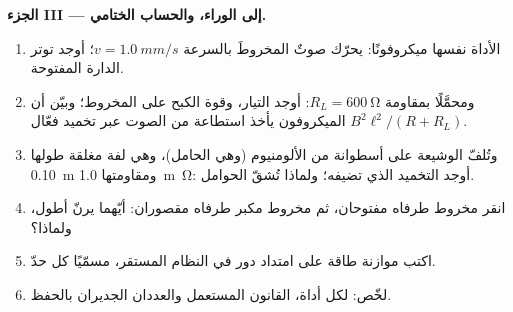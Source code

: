 \begin{problem}
\medskip
\noindent\textbf{الجزء III --- إلى الوراء، والحساب الختامي.}
\begin{enumerate}[resume]
  \item الأداة نفسها ميكروفونًا: يحرّك صوتٌ المخروطَ بالسرعة
        $v = \qty{1.0}{mm/s}$؛ أوجد توتر الدارة المفتوحة.
  \item ومحمَّلًا بمقاومة $R_L = \qty{600}{\ohm}$: أوجد التيار، وقوة الكبح
        على المخروط؛ وبيّن أن الميكروفون يأخذ استطاعة من الصوت
        عبر تخميد فعّال $B^2\ell^2/(R + R_L)$.
  \item وتُلفّ الوشيعة على أسطوانة من الألومنيوم (وهي الحامل)، وهي
        لفة مغلقة طولها \qty{0.10}{m} ومقاومتها \qty{1.0}{m\ohm}:
        أوجد التخميد الذي تضيفه؛ ولماذا تُشقّ الحوامل.
  \item انقر مخروط  طرفاه مفتوحان، ثم مخروط
        مكبر طرفاه مقصوران: أيّهما يرنّ أطول،
        ولماذا؟
  \item اكتب موازنة طاقة  على امتداد دور في النظام
        المستقر، مسمّيًا كل حدّ.
  \item لخّص: لكل أداة، القانون المستعمل والعددان
        الجديران بالحفظ.
\end{enumerate}
\end{problem}
